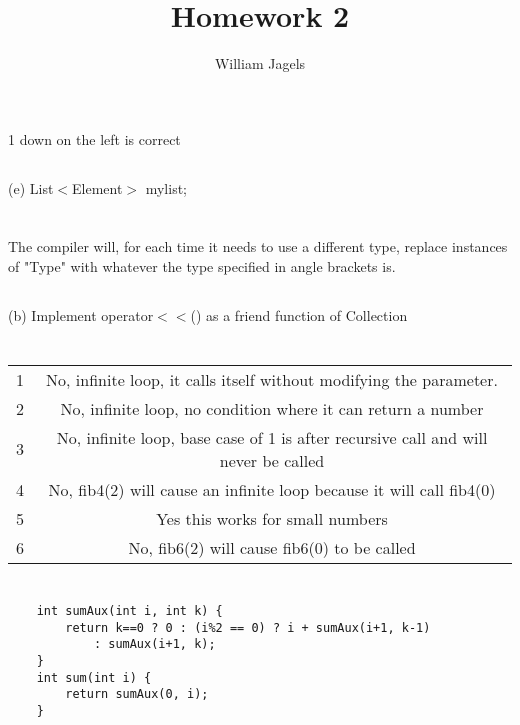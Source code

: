 \documentclass[tikz, a4paper,12pt]{article}
\begin{document}
\title{Homework 2}
\author{William Jagels}
\maketitle
\section{}
\subsection{}
1 down on the left is correct
\subsection{}
(e) List$<$Element$>$ mylist; 

\section{}
\subsection{}
The compiler will, for each time it needs to use a different type, replace instances of "Type" with whatever the type specified in angle brackets is.
\subsection{}
(b) Implement operator$<<$() as a friend function of Collection

\section{}
\begin{tabular}{l | c}
    1 & No, infinite loop, it calls itself without modifying the parameter.\\
    2 & No, infinite loop, no condition where it can return a number\\
    3 & No, infinite loop, base case of 1 is after recursive call and will never be called\\
    4 & No, fib4(2) will cause an infinite loop because it will call fib4(0)\\
    5 & Yes this works for small numbers\\
    6 & No, fib6(2) will cause fib6(0) to be called\\
\end{tabular}

\section{}
\lstset{language=C++}
\begin{lstlisting}
    int sumAux(int i, int k) {
        return k==0 ? 0 : (i%2 == 0) ? i + sumAux(i+1, k-1)
            : sumAux(i+1, k);
    }
    int sum(int i) {
        return sumAux(0, i);
    }
\end{lstlisting}
\end{document}
